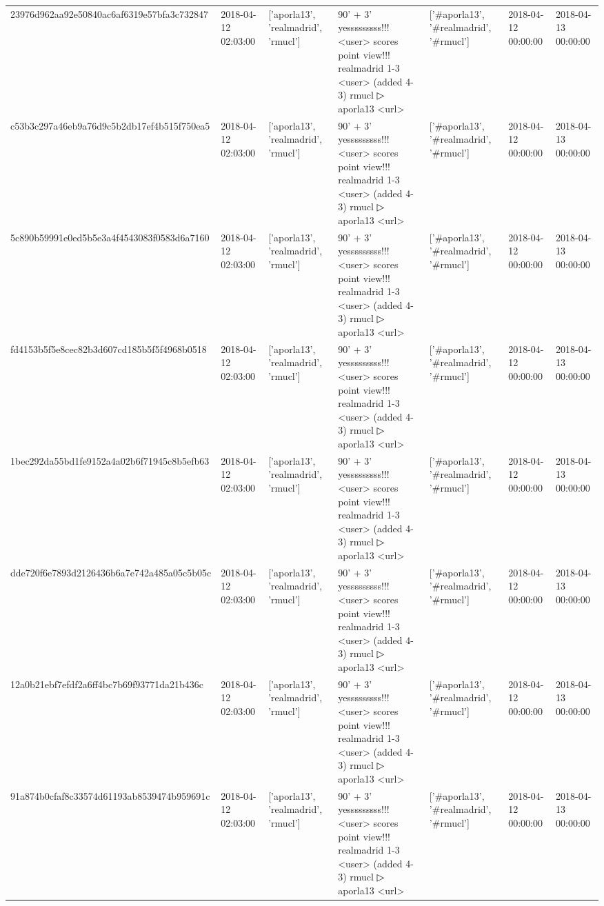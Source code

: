 \begin{tabular}{lllllll}
23976d962aa92e50840ac6af6319e57bfa3c732847 & 2018-04-12 02:03:00 & ['aporla13', 'realmadrid', 'rmucl'] & 90' + 3' yesssssssss!!! <user> scores point view!!! realmadrid 1-3 <user> (added 4-3) rmucl ▷ aporla13 <url> & ['#aporla13', '#realmadrid', '#rmucl'] & 2018-04-12 00:00:00 & 2018-04-13 00:00:00 \\
c53b3c297a46eb9a76d9c5b2db17ef4b515f750ea5 & 2018-04-12 02:03:00 & ['aporla13', 'realmadrid', 'rmucl'] & 90' + 3' yesssssssss!!! <user> scores point view!!! realmadrid 1-3 <user> (added 4-3) rmucl ▷ aporla13 <url> & ['#aporla13', '#realmadrid', '#rmucl'] & 2018-04-12 00:00:00 & 2018-04-13 00:00:00 \\
5c890b59991e0ed5b5e3a4f4543083f0583d6a7160 & 2018-04-12 02:03:00 & ['aporla13', 'realmadrid', 'rmucl'] & 90' + 3' yesssssssss!!! <user> scores point view!!! realmadrid 1-3 <user> (added 4-3) rmucl ▷ aporla13 <url> & ['#aporla13', '#realmadrid', '#rmucl'] & 2018-04-12 00:00:00 & 2018-04-13 00:00:00 \\
fd4153b5f5e8cec82b3d607cd185b5f5f4968b0518 & 2018-04-12 02:03:00 & ['aporla13', 'realmadrid', 'rmucl'] & 90' + 3' yesssssssss!!! <user> scores point view!!! realmadrid 1-3 <user> (added 4-3) rmucl ▷ aporla13 <url> & ['#aporla13', '#realmadrid', '#rmucl'] & 2018-04-12 00:00:00 & 2018-04-13 00:00:00 \\
1bec292da55bd1fe9152a4a02b6f71945c8b5efb63 & 2018-04-12 02:03:00 & ['aporla13', 'realmadrid', 'rmucl'] & 90' + 3' yesssssssss!!! <user> scores point view!!! realmadrid 1-3 <user> (added 4-3) rmucl ▷ aporla13 <url> & ['#aporla13', '#realmadrid', '#rmucl'] & 2018-04-12 00:00:00 & 2018-04-13 00:00:00 \\
dde720f6e7893d2126436b6a7e742a485a05c5b05c & 2018-04-12 02:03:00 & ['aporla13', 'realmadrid', 'rmucl'] & 90' + 3' yesssssssss!!! <user> scores point view!!! realmadrid 1-3 <user> (added 4-3) rmucl ▷ aporla13 <url> & ['#aporla13', '#realmadrid', '#rmucl'] & 2018-04-12 00:00:00 & 2018-04-13 00:00:00 \\
12a0b21ebf7efdf2a6ff4bc7b69f93771da21b436c & 2018-04-12 02:03:00 & ['aporla13', 'realmadrid', 'rmucl'] & 90' + 3' yesssssssss!!! <user> scores point view!!! realmadrid 1-3 <user> (added 4-3) rmucl ▷ aporla13 <url> & ['#aporla13', '#realmadrid', '#rmucl'] & 2018-04-12 00:00:00 & 2018-04-13 00:00:00 \\
91a874b0cfaf8c33574d61193ab8539474b959691c & 2018-04-12 02:03:00 & ['aporla13', 'realmadrid', 'rmucl'] & 90' + 3' yesssssssss!!! <user> scores point view!!! realmadrid 1-3 <user> (added 4-3) rmucl ▷ aporla13 <url> & ['#aporla13', '#realmadrid', '#rmucl'] & 2018-04-12 00:00:00 & 2018-04-13 00:00:00 \\

\end{tabular}
